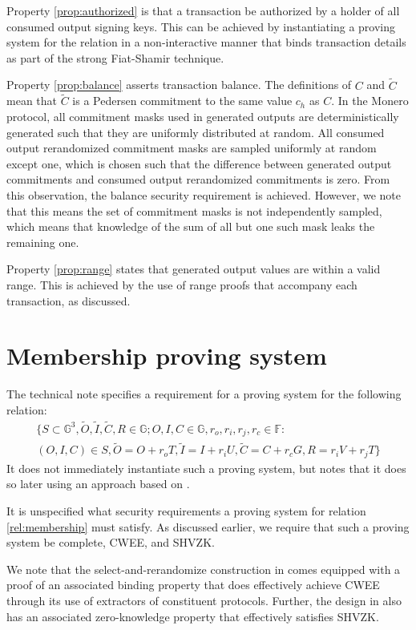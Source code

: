 \documentclass{article}
\theoremstyle{definition}
\newcommand{\GG}{\mathbb{G}}
\newcommand{\FF}{\mathbb{F}}
\newcommand{\wt}[1]{\widetilde{#1}}
\begin{document}
Property \ref{prop:authorized} is that a transaction be authorized by a holder of all consumed output signing keys.
This can be achieved by instantiating a proving system for the relation in a non-interactive manner that binds transaction details as part of the strong Fiat-Shamir technique.

Property \ref{prop:balance} asserts transaction balance.
The definitions of $C$ and $\wt{C}$ mean that $\wt{C}$ is a Pedersen commitment to the same value $c_h$ as $C$.
In the Monero protocol, all commitment masks used in generated outputs are deterministically generated such that they are uniformly distributed at random.
All consumed output rerandomized commitment masks are sampled uniformly at random except one, which is chosen such that the difference between generated output commitments and consumed output rerandomized commitments is zero.
From this observation, the balance security requirement is achieved.
However, we note that this means the set of commitment masks is not independently sampled, which means that knowledge of the sum of all but one such mask leaks the remaining one.

Property \ref{prop:range} states that generated output values are within a valid range.
This is achieved by the use of range proofs that accompany each transaction, as discussed.


\section{Membership proving system}

The technical note specifies a requirement for a proving system for the following relation:
\begin{multline}
	\label{rel:membership}
	\Big\{ S \subset \GG^3, \wt{O}, \wt{I}, \wt{C}, R \in \GG ; O, I, C \in \GG, r_o, r_i, r_j, r_c \in \FF : \\
	(O, I, C) \in S, \wt{O} = O + r_o T, \wt{I} = I + r_i U, \wt{C} = C + r_c G, R = r_i V + r_j T \Big\}
\end{multline}
It does not immediately instantiate such a proving system, but notes that it does so later using an approach based on \cite{curve_trees}.

It is unspecified what security requirements a proving system for relation \ref{rel:membership} must satisfy.
As discussed earlier, we require that such a proving system be complete, CWEE, and SHVZK.

We note that the select-and-rerandomize construction in \cite{curve_trees} comes equipped with a proof of an associated binding property that does effectively achieve CWEE through its use of extractors of constituent protocols.
Further, the design in \cite{curve_trees} also has an associated zero-knowledge property that effectively satisfies SHVZK.
\end{document}
